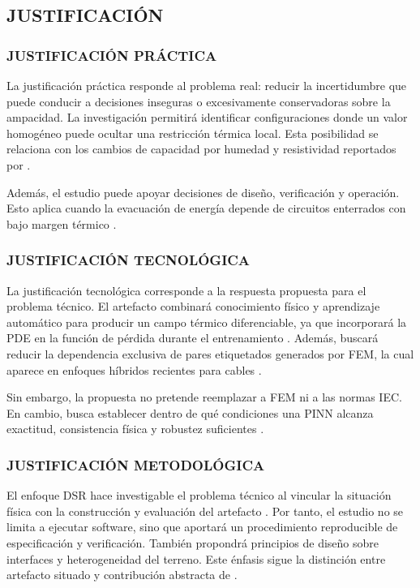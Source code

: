 \documentclass[11pt,a4paper,oneside]{report}
\begin{document}
\subsection{JUSTIFICACIÓN}

\subsubsection{JUSTIFICACIÓN PRÁCTICA}

La justificación práctica responde al problema real: reducir la incertidumbre que puede conducir a decisiones inseguras o excesivamente conservadoras sobre la ampacidad. La investigación permitirá identificar configuraciones donde un valor homogéneo puede ocultar una restricción térmica local. Esta posibilidad se relaciona con los cambios de capacidad por humedad y resistividad reportados por \textcite[1,6--9]{khumalo2025}.

Además, el estudio puede apoyar decisiones de diseño, verificación y operación. Esto aplica cuando la evacuación de energía depende de circuitos enterrados con bajo margen térmico \parencite[14842,14851]{fariz2026}.

\subsubsection{JUSTIFICACIÓN TECNOLÓGICA}

La justificación tecnológica corresponde a la respuesta propuesta para el problema técnico. El artefacto combinará conocimiento físico y aprendizaje automático para producir un campo térmico diferenciable, ya que incorporará la PDE en la función de pérdida durante el entrenamiento \parencite[686--690]{raissi2019}. Además, buscará reducir la dependencia exclusiva de pares etiquetados generados por FEM, la cual aparece en enfoques híbridos recientes para cables \parencite[1--3,12]{aldulaimi2024}.

Sin embargo, la propuesta no pretende reemplazar a FEM ni a las normas IEC. En cambio, busca establecer dentro de qué condiciones una PINN alcanza exactitud, consistencia física y robustez suficientes \parencite[93--99]{cigre2025}.

\subsubsection{JUSTIFICACIÓN METODOLÓGICA}

El enfoque DSR hace investigable el problema técnico al vincular la situación física con la construcción y evaluación del artefacto \parencite[55--56]{peffers2007}. Por tanto, el estudio no se limita a ejecutar software, sino que aportará un procedimiento reproducible de especificación y verificación. También propondrá principios de diseño sobre interfaces y heterogeneidad del terreno. Este énfasis sigue la distinción entre artefacto situado y contribución abstracta de \textcite[342--350]{gregor2013}.
\end{document}
